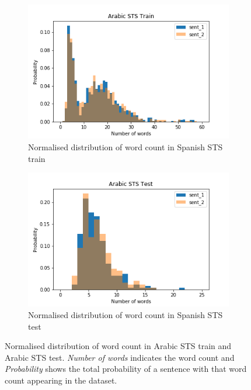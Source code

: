 \begin{enumerate}
\begin{figure}
	\captionsetup[subfigure]{justification=centering}
	\centering
	\begin{subfigure}[b]{.5\textwidth}
		\centering
		\includegraphics[width=\textwidth]{figures/semantic_textual_similarity/introduction/arabic_sts_train_words.png}
		\caption{Normalised distribution of word count in Spanish STS train}
		\label{fig:arabic_sts_train_words}
	\end{subfigure}%
	\begin{subfigure}[b]{.5\textwidth}
		\centering
		\includegraphics[width=\textwidth]{figures/semantic_textual_similarity/introduction/arabic_sts_test_words.png}
		\caption{Normalised distribution of word count in Spanish STS test}
		\label{fig:arabic_sts_test_words}
	\end{subfigure}
	\caption[Normalised distribution of word count in Arabic STS train and Arabic STS test.]{Normalised distribution of word count in Arabic STS train and Arabic STS test. \textit{Number of words} indicates the word count and \textit{Probability} shows the total probability of a sentence with that word count appearing in the dataset.}
	\label{fig:arabic_sts_words}
\end{figure}


\end{enumerate}
